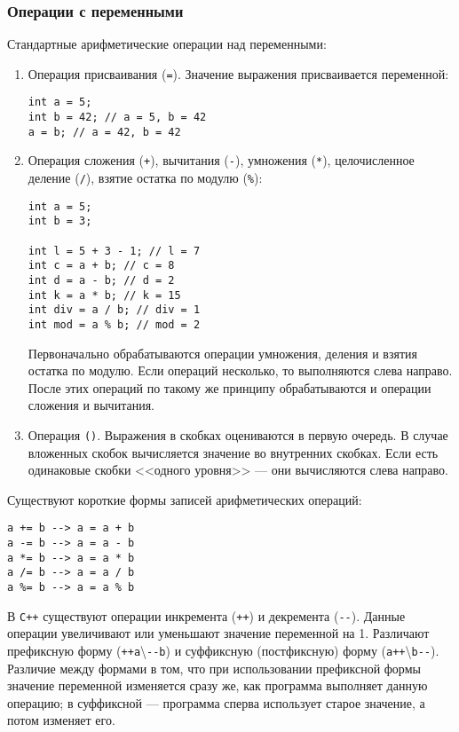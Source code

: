 \subsubsection{Операции с переменными}
Стандартные арифметические операции над переменными:
\begin{enumerate}
    \item Операция присваивания (\lstinline{=}). Значение выражения присваивается переменной:
    \begin{lstlisting}
int a = 5;
int b = 42; // a = 5, b = 42
a = b; // a = 42, b = 42
    \end{lstlisting}
    \item Операция сложения (\lstinline{+}), вычитания (\lstinline{-}), умножения (\lstinline{*}), целочисленное деление (\lstinline{/}), взятие остатка по модулю (\lstinline{%}):
    \begin{lstlisting}
int a = 5;
int b = 3;

int l = 5 + 3 - 1; // l = 7
int c = a + b; // c = 8
int d = a - b; // d = 2
int k = a * b; // k = 15
int div = a / b; // div = 1
int mod = a % b; // mod = 2
    \end{lstlisting}

    Первоначально обрабатываются операции умножения, деления и взятия остатка по модулю. Если операций несколько, то выполняются слева направо. После этих операций по такому же принципу обрабатываются и операции сложения и вычитания.

    \item Операция \lstinline{()}. Выражения в скобках оцениваются в первую очередь. В случае вложенных скобок вычисляется значение во внутренних скобках. Если есть одинаковые скобки <<одного уровня>> --- они вычисляются слева направо.
\end{enumerate}

Существуют короткие формы записей арифметических операций:
\begin{lstlisting}
a += b --> a = a + b
a -= b --> a = a - b
a *= b --> a = a * b
a /= b --> a = a / b
a %= b --> a = a % b
\end{lstlisting}

В \texttt{С++} существуют операции инкремента (\lstinline{++}) и декремента (\lstinline{--}). Данные операции увеличивают или уменьшают значение переменной на 1. Различают префиксную форму (\lstinline{++a}\textbackslash \lstinline{--b}) и суффиксную (постфиксную) форму (\lstinline{a++}\textbackslash \lstinline{b--}). Различие между формами в том, что при использовании префиксной формы значение переменной изменяется сразу же, как программа выполняет данную операцию; в суффиксной --- программа сперва использует старое значение, а потом изменяет его.

